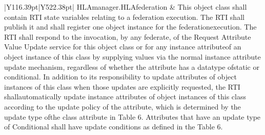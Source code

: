 \begin{landscape}
\begin{momtabletypeset}[8.00]
{{\begin{tabular}{|Y{116.39pt}|Y{522.38pt}|}
                    HLAmanager.\allowbreak{}HLAfederation     & This object class shall contain RTI state variables relating to a federation execution.\allowbreak{} The RTI shall publish it and shall register one object instance for the federation\allowbreak{}execution.\allowbreak{} The RTI shall respond to the invocation, by any federate, of the Request Attribute Value Update service for this object class or for any instance attribute\allowbreak{}of an object instance of this class by supplying values via the normal instance attribute update mechanism, regardless of whether the attribute has a datatype of\allowbreak{}static or conditional.\allowbreak{} In addition to its responsibility to update attributes of object instances of this class when those updates are explicitly requested, the RTI shall\allowbreak{}automatically update instance attributes of object instances of this class according to the update policy of the attribute, which is determined by the update type of\allowbreak{}the class attribute in Table 6.\allowbreak{} Attributes that have an update type of Conditional shall have update conditions as defined in the Table 6.\allowbreak{}                                                                                                                                                                                                                                                                                                                                                                                                                                                                                                                                                                                                                                                                                                                                                                                                                                                     \\
                    \hline

\end{tabular}}}
\end{momtabletypeset}
\end{landscape}

